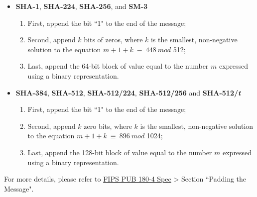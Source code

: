 \documentclass[main\_\_EN.tex]{subfiles}
\begin{document}
\begin{itemize}
    \item \textbf{SHA-1}, \textbf{SHA-224}, \textbf{SHA-256}, and \textbf{SM-3}
        \begin{enumerate}
            \item First, append the bit ``1" to the end of the message;
            \item Second, append \begin{math} k \end{math} bits of zeros, where \begin{math} k \end{math} is the smallest, non-negative solution to the equation \begin{math}m + 1 + k \ {\equiv} \ 448 \ mod \end{math} 512;
            \item Last, append the 64-bit block of value equal to the number \begin{math} m \end{math} expressed using a binary representation.
        \end{enumerate}
    \item \textbf{SHA-384}, \textbf{SHA-512}, \textbf{SHA-512/224}, \textbf{SHA-512/256} and \textbf{SHA-512/{\it{t}}}
        \begin{enumerate}
        \item First, append the bit ``1" to the end of the message;
        \item Second, append \begin{math} k \end{math} zero bits, where \begin{math} k \end{math} is the smallest, non-negative solution to the equation \begin{math}m + 1 + k \ {\equiv} \ 896 \ mod \end{math} 1024;
        \item Last, append the 128-bit block of value equal to the number \begin{math} m \end{math} expressed using a binary representation.
        \end{enumerate}
\end{itemize}

For more details, please refer to \href{https://doi.org/10.6028/NIST.FIPS.180-4}{FIPS PUB 180-4 Spec} > Section ``Padding the Message".
\end{document}
